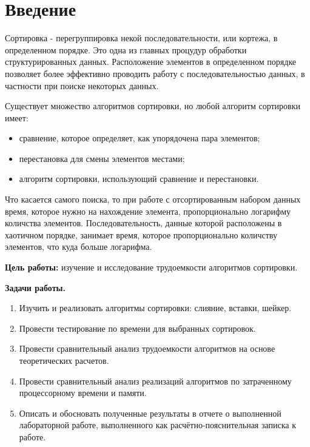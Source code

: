 \chapter*{Введение}

Сортировка - перегруппировка некой последовательности, или кортежа, в определенном порядке. Это одна из главных процудур обработки структурированных данных. Расположение элементов в определенном порядке позволяет более эффективно проводить работу с последовательностью данных, в частности при поиске некоторых данных. \newline

Существует множество алгоритмов сортировки, но любой алгоритм сортировки имеет:
\begin{itemize}
	\item сравнение, которое определяет, как упорядочена пара элементов;
    \item перестановка для смены элементов местами;
    \item алгоритм сортировки, использующий сравнение и перестановки. \newline
\end{itemize}

Что касается самого поиска, то при работе с отсортированным набором данных время, которое нужно на нахождение элемента, пропорционально логарифму количства элементов. Последовательность, данные которой расположены в хаотичном порядке, занимает время, которое пропорционально количству элементов, что куда больше логарифма. \newline

\textbf{Цель работы:} изучение и исследование трудоемкости алгоритмов сортировки. \newline

\textbf{Задачи работы.}
\begin{enumerate}
	\item Изучить и реализовать алгоритмы сортировки: слияние, вставки, шейкер.
    \item Провести тестирование по времени для выбранных сортировок.
    \item Провести сравнительный анализ трудоемкости алгоритмов на основе теоретических расчетов.
    \item Провести сравнительный анализ реализаций алгоритмов по затраченному процессорному времени и памяти.
	\item Описать и обосновать полученные результаты в отчете о выполненной лабораторной работе, выполненного как расчётно-пояснительная записка к работе.
\end{enumerate}
